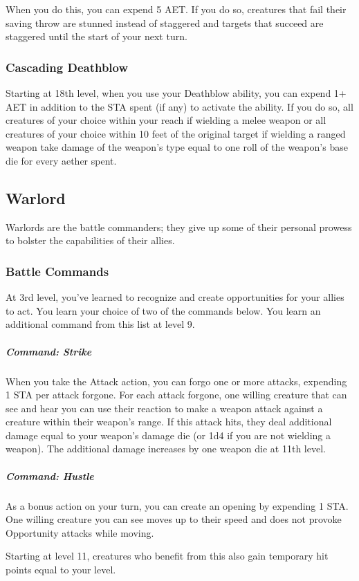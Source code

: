 When you do this, you can expend 5 AET. If you do so, creatures that fail their saving throw are stunned instead of staggered and targets that succeed are staggered until the start of your next turn.

\subsubsection{Cascading Deathblow}
Starting at 18th level, when you use your Deathblow ability, you can expend 1+ AET in addition to the STA spent (if any) to activate the ability. If you do so, all creatures of your choice within your reach if wielding a melee weapon or all creatures of your choice within 10 feet of the original target if wielding a ranged weapon take damage of the weapon's type equal to one roll of the weapon's base die for every aether spent.

\subsection{Warlord}
Warlords are the battle commanders; they give up some of their personal prowess to bolster the capabilities of their allies.

\subsubsection{Battle Commands}
At 3rd level, you've learned to recognize and create opportunities for your allies to act. You learn your choice of two of the commands below. You learn an additional command from this list at level 9.

\subparagraph{Command: Strike}
When you take the Attack action, you can forgo one or more attacks, expending 1 STA per attack forgone. For each attack forgone, one willing creature that can see and hear you can use their reaction to make a weapon attack against a creature within their weapon's range. If this attack hits, they deal additional damage equal to your weapon's damage die (or 1d4 if you are not wielding a weapon). The additional damage increases by one weapon die at 11th level.

\subparagraph{Command: Hustle}
As a bonus action on your turn, you can create an opening by expending 1 STA. One willing creature you can see moves up to their speed and does not provoke Opportunity attacks while moving.

Starting at level 11, creatures who benefit from this also gain temporary hit points equal to your level.

